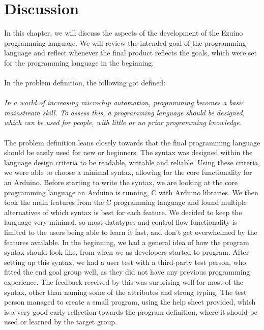 \chapter{Discussion}
In this chapter, we will discuss the aspects of the development of the Ezuino programming language. We will review the intended goal of the programming language and reflect whenever the final product reflects the goals, which were set for the programming language in the beginning.   
\\\\
In the problem definition, the following got defined:  
\\\\
\textit{In a world of increasing microchip automation, programming becomes a basic mainstream skill. To assess this, a programming language should be designed, which can be used for people, with little or no prior programming knowledge. } 
\\\\
The problem definition leans closely towards that the final programming language should be easily used for new or beginners. The syntax was designed within the language design criteria to be readable, writable and reliable. Using these criteria, we were able to choose a minimal syntax, allowing for the core functionality for an Arduino. Before starting to write the syntax, we are looking at the core programming language an Arduino is running, C with Arduino libraries. We then took the main features from the C programming language and found multiple alternatives of which syntax is best for each feature. We decided to keep the language very minimal, so most datatypes and control flow functionality is limited to the users being able to learn it fast, and don’t get overwhelmed by the features available. In the beginning, we had a general idea of how the program syntax should look like, from when we as developers started to program. After setting up this syntax, we had a user test with a third-party test person, who fitted the end goal group well, as they did not have any previous programming experience. The feedback received by this was surprising well for most of the syntax, other than naming some of the attributes and strong typing. The test person managed to create a small program, using the help sheet provided, which is a very good early reflection towards the program definition, where it should be used or learned by the target group.  
\\\\
